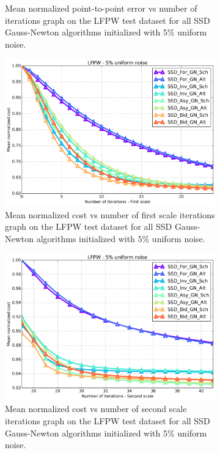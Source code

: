 \begin{figure}[h!]
\begin{subfigure}{0.48\textwidth}
	    \caption{Mean normalized point-to-point error vs number of iterations graph on the LFPW test dataset for all SSD Gauss-Newton algorithms initialized with $5\%$ uniform noise.}
	    \label{fig:mean_error_vs_iters_ssd_gn_5}
	\end{subfigure}
	\par\medskip
	\begin{subfigure}{0.48\textwidth}
	    \includegraphics[width=\textwidth]{experiments/algorithms/ssd_gn/mean_cost_vs_iters1_ssd_gn_5.png}
	    \caption{Mean normalized cost vs number of first scale iterations graph on the LFPW test dataset for all SSD Gauss-Newton algorithms initialized with $5\%$ uniform noise.}
	    \label{fig:mean_cost_vs_iters1_ssd_gn_5}
	\end{subfigure}
	\hfill
	\begin{subfigure}{0.48\textwidth}
	    \includegraphics[width=\textwidth]{experiments/algorithms/ssd_gn/mean_cost_vs_iters2_ssd_gn_5.png}
	    \caption{Mean normalized cost vs number of second scale iterations graph on the LFPW test dataset for all SSD Gauss-Newton algorithms initialized with $5\%$ uniform noise.}
	    \label{fig:mean_cost_vs_iters2_ssd_gn_5}
	\end{subfigure}
	\label{fig:ssd_gn_5}
	\caption{}
\end{figure}


